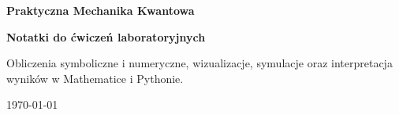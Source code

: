 \begin{titlepage}
    \begin{center}
        \begin{tcolorbox}[
            enhanced,
            width=0.88\textwidth,
            colback=white,
            colframe=SectionBlue,
            boxrule=1.0pt,
            arc=6pt,
            left=14mm,
            right=14mm,
            top=12mm,
            bottom=12mm,
            halign=center,
            drop shadow={black!18!white}
        ]
            {\Huge\bfseries\color{ChapterBlue} Praktyczna Mechanika Kwantowa\par}
            \vspace{0.25cm}
            {\LARGE\bfseries\color{SectionBlue} Notatki do ćwiczeń laboratoryjnych\par}
            \vspace{0.55cm}
            {\large\color{black!68}
            Obliczenia symboliczne i numeryczne, wizualizacje, symulacje oraz interpretacja wyników w Mathematice i Pythonie.\par}
        \end{tcolorbox}
    \end{center}

    \vfill

    \begin{center}
        {\large\color{ChapterBlue}\today\par}
    \end{center}

    \vspace*{0.8cm}
\end{titlepage}

